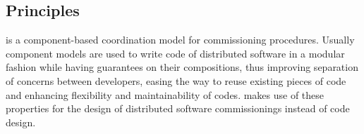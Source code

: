 
\subsection{Principles}

\mad is a component-based coordination model for commissioning
procedures. Usually component models are used to write code of
distributed software in a modular fashion while having guarantees on
their compositions, thus improving separation of concerns between
developers, easing the way to reuse existing pieces of code and
enhancing flexibility and maintainability of codes. \mad makes use of
these properties for the design of distributed software commissionings
instead of code design.

